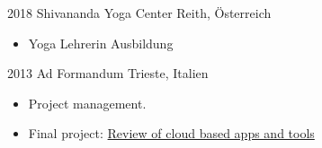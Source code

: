 \documentclass[a4paper,]{fortysecondscv}
\begin{document}
		\begin{cvtable}[2]
			\cvitem
				{2018}
				{Shivananda Yoga Center}
				{Reith, Österreich}
				{
					\vspace{-\topsep}
					\begin{itemize}[nosep, leftmargin=0pt, label={}]
						\item Yoga Lehrerin Ausbildung
					\end{itemize}
				}
			\cvitem
				{2013}
				{Ad Formandum}
				{Trieste, Italien}
				{
					\vspace{-\topsep}
					\begin{itemize}[nosep, leftmargin=0pt, label={}]
						\item Project management.
						\item Final project: \href{http://www.slideshare.net/RajwinderKaur11/thinkgeek-48135808}{Review of cloud based apps and tools}
					\end{itemize}
				}
		\end{cvtable}



\end{document}
